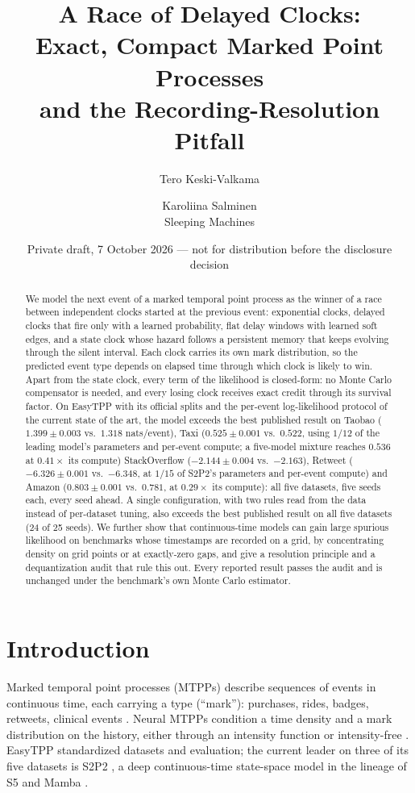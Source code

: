 \documentclass[11pt]{article}
\title{A Race of Delayed Clocks:\\ Exact, Compact Marked Point Processes\\ and the Recording-Resolution Pitfall}
\author{Tero Keski-Valkama \and Karoliina Salminen\\ \small Sleeping Machines}
\date{Private draft, 7 October 2026 --- not for distribution before the disclosure decision}
\begin{document}
\maketitle

\begin{abstract}
We model the next event of a marked temporal point process as the winner of a race between independent clocks started at the previous event: exponential clocks, delayed clocks that fire only with a learned probability, flat delay windows with learned soft edges, and a state clock whose hazard follows a persistent memory that keeps evolving through the silent interval. Each clock carries its own mark distribution, so the predicted event type depends on elapsed time through which clock is likely to win. Apart from the state clock, every term of the likelihood is closed-form: no Monte Carlo compensator is needed, and every losing clock receives exact credit through its survival factor. On EasyTPP with its official splits and the per-event log-likelihood protocol of the current state of the art, the model exceeds the best published result on Taobao ($1.399 \pm 0.003$ vs.\ $1.318$ nats/event), Taxi ($0.525 \pm 0.001$ vs.\ $0.522$, using $1/12$ of the leading model's parameters and per-event compute; a five-model mixture reaches $0.536$ at $0.41\times$ its compute) StackOverflow ($-2.144 \pm 0.004$ vs.\ $-2.163$), Retweet ($-6.326 \pm 0.001$ vs.\ $-6.348$, at $1/15$ of S2P2's parameters and per-event compute) and Amazon ($0.803 \pm 0.001$ vs.\ $0.781$, at $0.29\times$ its compute): all five datasets, five seeds each, every seed ahead. A single configuration, with two rules read from the data instead of per-dataset tuning, also exceeds the best published result on all five datasets (24 of 25 seeds). We further show that continuous-time models can gain large spurious likelihood on benchmarks whose timestamps are recorded on a grid, by concentrating density on grid points or at exactly-zero gaps, and give a resolution principle and a dequantization audit that rule this out. Every reported result passes the audit and is unchanged under the benchmark's own Monte Carlo estimator.
\end{abstract}

\section{Introduction}
Marked temporal point processes (MTPPs) describe sequences of events in continuous time, each carrying a type (``mark''): purchases, rides, badges, retweets, clinical events \citep{daley2003}. Neural MTPPs condition a time density and a mark distribution on the history, either through an intensity function \citep{du2016rmtpp,mei2017nhp,zuo2020thp,zhang2020sahp,yang2022attnhp,chang2025s2p2} or intensity-free \citep{shchur2020iftpp}. EasyTPP \citep{xue2024easytpp} standardized datasets and evaluation; the current leader on three of its five datasets is S2P2 \citep{chang2025s2p2}, a deep continuous-time state-space model in the lineage of S5 and Mamba \citep{smith2023s5,gu2023mamba}.
\end{document}
